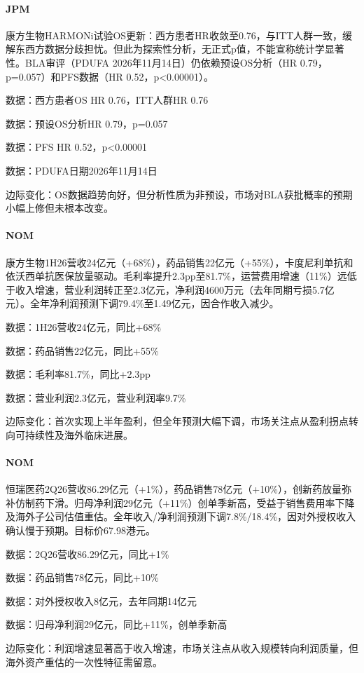 \documentclass[11pt]{ctexart}
\begin{document}
\paragraph{JPM} 康方生物HARMONi试验OS更新：西方患者HR收敛至0.76，与ITT人群一致，缓解东西方数据分歧担忧。但此为探索性分析，无正式p值，不能宣称统计学显著性。BLA审评（PDUFA 2026年11月14日）仍依赖预设OS分析（HR 0.79，p=0.057）和PFS数据（HR 0.52，p<0.00001）。
{\small\color{refgray}数据：西方患者OS HR 0.76，ITT人群HR 0.76\par}
{\small\color{refgray}数据：预设OS分析HR 0.79，p=0.057\par}
{\small\color{refgray}数据：PFS HR 0.52，p<0.00001\par}
{\small\color{refgray}数据：PDUFA日期2026年11月14日\par}
{\small\color{refgray}边际变化：OS数据趋势向好，但分析性质为非预设，市场对BLA获批概率的预期小幅上修但未根本改变。\par}
\paragraph{NOM} 康方生物1H26营收24亿元（+68\%），药品销售22亿元（+55\%），卡度尼利单抗和依沃西单抗医保放量驱动。毛利率提升2.3pp至81.7\%，运营费用增速（11\%）远低于收入增速，营业利润转正至2.3亿元，净利润4600万元（去年同期亏损5.7亿元）。全年净利润预测下调79.4\%至1.49亿元，因合作收入减少。
{\small\color{refgray}数据：1H26营收24亿元，同比+68\%\par}
{\small\color{refgray}数据：药品销售22亿元，同比+55\%\par}
{\small\color{refgray}数据：毛利率81.7\%，同比+2.3pp\par}
{\small\color{refgray}数据：营业利润2.3亿元，营业利润率9.7\%\par}
{\small\color{refgray}边际变化：首次实现上半年盈利，但全年预测大幅下调，市场关注点从盈利拐点转向可持续性及海外临床进展。\par}
\paragraph{NOM} 恒瑞医药2Q26营收86.29亿元（+1\%），药品销售78亿元（+10\%），创新药放量弥补仿制药下滑。归母净利润29亿元（+11\%）创单季新高，受益于销售费用率下降及海外子公司估值重估。全年收入/净利润预测下调7.8\%/18.4\%，因对外授权收入确认慢于预期。目标价67.98港元。
{\small\color{refgray}数据：2Q26营收86.29亿元，同比+1\%\par}
{\small\color{refgray}数据：药品销售78亿元，同比+10\%\par}
{\small\color{refgray}数据：对外授权收入8亿元，去年同期14亿元\par}
{\small\color{refgray}数据：归母净利润29亿元，同比+11\%，创单季新高\par}
{\small\color{refgray}边际变化：利润增速显著高于收入增速，市场关注点从收入规模转向利润质量，但海外资产重估的一次性特征需留意。\par}
\end{document}
